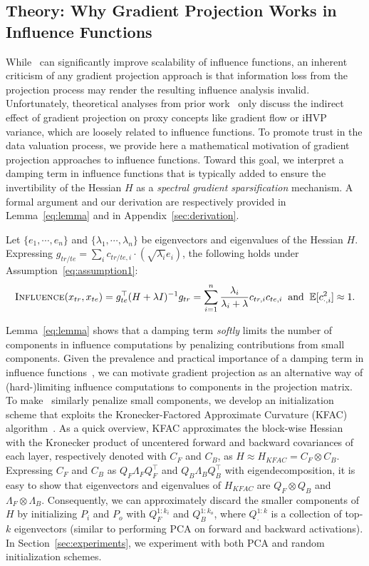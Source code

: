 \subsection{Theory: Why Gradient Projection Works in Influence Functions}
\label{sec:theory}
While \method\ can significantly improve scalability of influence functions, an inherent criticism of any gradient projection approach is that information loss from the projection process may render the resulting influence analysis invalid. Unfortunately, theoretical analyses from prior work~\cite{park2023trak,schioppa2022scaling} only discuss the indirect effect of gradient projection on proxy concepts like gradient flow or iHVP variance, which are loosely related to influence functions. To promote trust in the data valuation process, we provide here a mathematical motivation of gradient projection approaches to influence functions. Toward this goal, we interpret a damping term in influence functions that is typically added to ensure the invertibility of the Hessian $H$ as a \textit{spectral gradient sparsification} mechanism. A formal argument and our derivation are respectively provided in Lemma~\ref{eq:lemma} and in Appendix~\ref{sec:derivation}.
\begin{lemma}
\label{eq:lemma}
Let $\{e_1,\cdots,e_n\}$ and $\{\lambda_1,\cdots,\lambda_n\}$ be eigenvectors and eigenvalues of the Hessian $H$. Expressing $g_{tr/te} =\sum_ic_{tr/te,i}\cdot(\sqrt{\lambda_i}e_i)$, the following holds under Assumption~\ref{eq:assumption1}:
\begin{align*}
  \textsc{Influence}(x_{tr}, x_{te}) = g_{te}^\top (H+\lambda I)^{-1}g_{tr} = \sum_{i=1}^n\frac{\lambda_i}{\lambda_i+\lambda}c_{tr,i}c_{te,i}\;\;\text{and}\;\;\mathbb{E}[c_{\cdot,i}^2]\approx 1.  
\end{align*}
\end{lemma}
Lemma~\ref{eq:lemma} shows that a damping term \textit{softly} limits the number of components in influence computations by penalizing contributions from small components. Given the prevalence and practical importance of a damping term in influence functions~\cite{basu2020influence}, we can motivate gradient projection as an alternative way of (hard-)limiting influence computations to components in the projection matrix.
To make \method\ similarly penalize small components, we develop an initialization scheme that exploits the Kronecker-Factored Approximate Curvature (KFAC) algorithm~\cite{martens2015optimizing}.
As a quick overview, KFAC approximates the block-wise Hessian with the Kronecker product of uncentered forward and backward covariances of each layer, respectively denoted with $C_F$ and $C_B$, as $H\approx H_{KFAC} = C_F \otimes C_B$.
Expressing $C_F$ and $C_B$ as $Q_F\Lambda_FQ_F^\top$ and $Q_B\Lambda_BQ_B^\top$ with eigendecomposition, it is easy to show that eigenvectors and eigenvalues of $H_{KFAC}$ are $Q_F\otimes Q_B$ and $\Lambda_F\otimes \Lambda_B$. Consequently, we can approximately discard the smaller components of $H$ by initializing $P_i$ and $P_o$ with $Q_F^{1:k_i}$ and $Q_B^{1:k_o}$, where $Q_\cdot^{1:k}$ is a collection of top-$k$ eigenvectors (similar to performing PCA on forward and backward activations). In Section~\ref{sec:experiments}, we experiment with both PCA and random initialization schemes.

